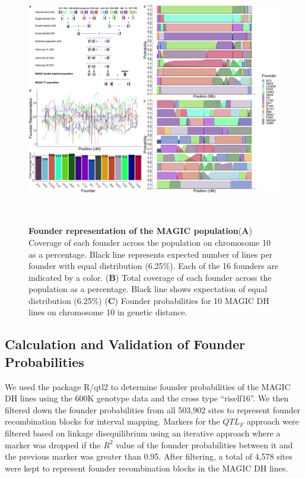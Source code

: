 \documentclass[9pt,twocolumn,twoside]{gsag3jnl}
\begin{document}
\begin{figure}[h!]
\centering
\includegraphics[width=\textwidth,height=11cm]{figures/Methods_Fig1.png}
\caption{\textbf{Founder representation of the MAGIC population}(\textbf{A}) Coverage of each founder across the population on chromosome 10 as a percentage. Black line represents expected number of lines per founder with equal distribution (6.25\%). Each of the 16 founders are indicated by a color. (\textbf{B}) Total coverage of each founder across the population as a percentage. Black line shows expectation of equal distribution (6.25\%)  (\textbf{C}) Founder probabilities for 10 MAGIC DH lines on chromosome 10 in genetic distance.}
\label{fig:figure1}
\end{figure}

\subsection{Calculation and Validation of Founder Probabilities}
We used the package R/qtl2 \citep{Broman} to determine founder probabilities of the MAGIC DH lines using the 600K genotype data and the cross type ``riself16''.
We then filtered down the founder probabilities from all 503,902 sites to represent founder recombination blocks for interval mapping.
Markers for the $QTL_F$ approach were filtered based on linkage disequilibrium using an iterative approach where a marker was dropped if the $R^2$ value of the founder probabilities between it and the previous marker was greater than 0.95.
After filtering, a total of 4,578 sites were kept to represent founder recombination blocks in the MAGIC DH lines.
\end{document}

